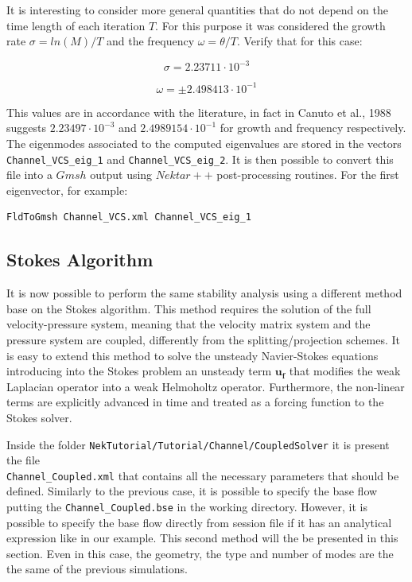 \documentclass[a4paper,12pt]{article}
\begin{document}
It is interesting to consider more general quantities that do not depend on the time length of each iteration $T$. For this purpose it was considered the growth rate $\sigma=ln(M)/T$ and the frequency $\omega= \theta/T$. Verify that for this case:

\begin{equation}
\sigma=2.23711 \cdot 10^{-3}
\end{equation}

\begin{equation}
\omega=\pm 2.498413 \cdot 10^{-1}
\end{equation}

This values are in accordance with the literature, in fact in Canuto et al., 1988 suggests $2.23497\cdot 10^{-3}$ and $2.4989154\cdot 10^{-1}$ for growth and frequency respectively.
The eigenmodes associated to the computed eigenvalues are stored in the vectors \texttt{Channel\_VCS\_eig\_1} and \texttt{Channel\_VCS\_eig\_2}. It is then possible to convert this file into a $Gmsh$ output using $Nektar++$ post-processing routines. For the first eigenvector, for example:

\begin{verbatim}
FldToGmsh Channel_VCS.xml Channel_VCS_eig_1
\end{verbatim}

\clearpage
\subsection{Stokes Algorithm}

It is now possible to perform the same stability analysis using a different method base on the Stokes algorithm. This method requires the solution of the full velocity-pressure system, meaning that the velocity matrix system and the pressure system are coupled, differently from the splitting/projection schemes. It is easy to extend this method to solve the unsteady  Navier-Stokes equations introducing  into the Stokes problem an unsteady term $\mathbf{u_f}$ that modifies the weak Laplacian operator into a weak Helmoholtz operator. Furthermore, the non-linear terms are explicitly advanced in time and treated as a forcing function to the Stokes solver.

\vspace{0.5cm}

Inside the folder \texttt{NekTutorial/Tutorial/Channel/CoupledSolver} it is present the file\\ \texttt{Channel\_Coupled.xml} that contains all the necessary parameters that should be defined. Similarly to the previous case, it is possible to specify the base flow putting the \texttt{Channel\_Coupled.bse} in the working directory. However, it is possible to specify the base flow directly from session file if it has an analytical expression like in our example. This second method will the be presented in this section. Even in this case, the geometry, the type and number of modes are the the same of the previous simulations.
\end{document}
